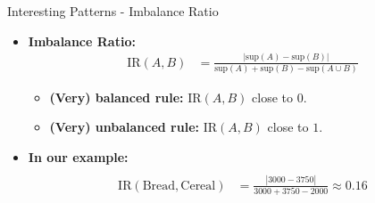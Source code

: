 \begin{frame}{Interesting Patterns - Imbalance Ratio}
	\begin{itemize}
		\item \textbf{Imbalance Ratio:}
		      \begin{align*}
			      \text{IR}(A,B) & = \frac{|\text{sup}(A) - \text{sup}(B)|}{\text{sup}(A) + \text{sup}(B) - \text{sup}(A \cup B)}
		      \end{align*}
		      \begin{itemize}
			      \item \textbf{(Very) balanced rule:} $\text{IR}(A,B)$ close to $0$.
			      \item \textbf{(Very) unbalanced rule:}  $\text{IR}(A,B)$ close to $1$.
		      \end{itemize}
		\item \textbf{In our example:} \\
		      \begin{align*}                       \\
			      \text{IR}(\text{Bread},\text{Cereal}) & = \frac{|3000 - 3750|}{3000 + 3750 - 2000} \approx 0.16
		      \end{align*}
	\end{itemize}
\end{frame}
